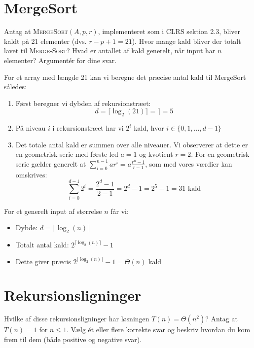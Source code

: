 \documentclass{article}
\theoremstyle{definition}
\begin{document}
\section{MergeSort}
Antag at \textsc{MergeSort}$(A,p,r)$, implementeret som i CLRS sektion 2.3, bliver kaldt på 21 
elementer (dvs. $r-p+1=21$). Hvor mange kald bliver der totalt lavet til \textsc{Merge-Sort}? 
Hvad er antallet af kald generelt, når input har $n$ elementer? Argumentér for dine svar.

For et array med længde 21 kan vi beregne det præcise antal kald til MergeSort således:

\begin{enumerate}
    \item Først beregner vi dybden af rekursionstræet:
        \[ d = \lceil \log_2(21) \rceil =  \rceil = 5 \]
    
    \item På niveau $i$ i rekursionstræet har vi $2^i$ kald, hvor $i \in \{0,1,...,d-1\}$
    
    \item Det totale antal kald er summen over alle niveauer. 
    Vi observerer at dette er en geometrisk serie med første led $a=1$ og kvotient $r=2$. For en geometrisk serie gælder generelt at $\sum_{i=0}^{n-1} ar^i = a\frac{r^n - 1}{r-1}$, som med vores værdier kan omskrives:
        \[ \sum_{i=0}^{d-1} 2^i = \frac{2^d - 1}{2-1} = 2^d - 1 = 2^5 - 1 = 31 \text{ kald} \]
\end{enumerate}

For et generelt input af størrelse $n$ får vi:
\begin{itemize}
    \item Dybde: $d = \lceil \log_2(n) \rceil$
    \item Totalt antal kald: $2^{\lceil \log_2(n) \rceil} - 1$
    \item Dette giver præcis $2^{\lceil \log_2(n) \rceil} - 1 = \Theta(n)$ kald
\end{itemize}

\section{Rekursionsligninger}
Hvilke af disse rekursionsligninger har løsningen $T(n) = \Theta(n^2)$? Antag at $T(n) = 1$ for 
$n \leq 1$. Vælg ét eller flere korrekte svar og beskriv hvordan du kom frem til dem (både 
positive og negative svar).
\end{document}

